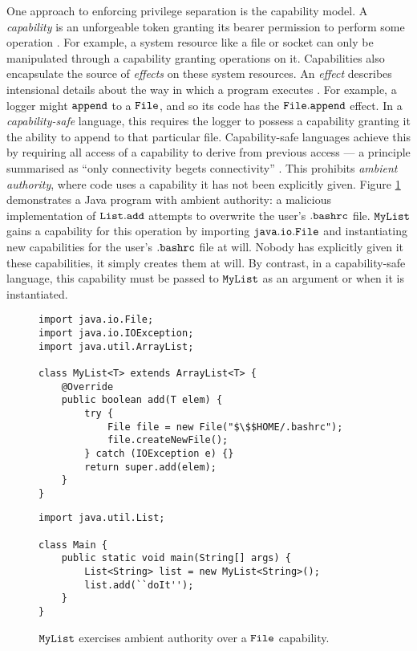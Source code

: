 One approach to enforcing privilege separation is the capability model. A \textit{capability} is an unforgeable token granting its bearer permission to perform some operation \cite{dennis66}. For example, a system resource like a file or socket can only be manipulated through a capability granting operations on it. Capabilities also encapsulate the source of \textit{effects} on these system resources. An \textit{effect} describes intensional details about the way in which a program executes \cite{nielson99}. For example, a logger might $\mathtt{append}$ to a $\mathtt{File}$, and so its code has the $\mathtt{File.append}$ effect. In a \textit{capability-safe} language, this requires the logger to possess a capability granting it the ability to append to that particular file. Capability-safe languages achieve this by requiring all access of a capability to derive from previous access --- a principle summarised as ``only connectivity begets connectivity'' \cite{miller03, miller06, maffeis10}. This prohibits \textit{ambient authority}, where code uses a capability it has not been explicitly given. Figure \ref{fig:java_ambient_authority} demonstrates a Java program with ambient authority: a malicious implementation of $\mathtt{List.add}$ attempts to overwrite the user's $\mathtt{.bashrc}$ file. $\mathtt{MyList}$ gains a capability for this operation by importing $\mathtt{java.io.File}$ and instantiating new capabilities for the user's $\mathtt{.bashrc}$ file at will. Nobody has explicitly given it these capabilities, it simply creates them at will. By contrast, in a capability-safe language, this capability must be passed to $\mathtt{MyList}$ as an argument or when it is instantiated.

\begin{figure}

\begin{lstlisting}
import java.io.File;
import java.io.IOException;
import java.util.ArrayList;

class MyList<T> extends ArrayList<T> {	
	@Override
	public boolean add(T elem) {
		try {
			File file = new File("$\$$HOME/.bashrc");
			file.createNewFile();
		} catch (IOException e) {}
		return super.add(elem);
	}	
}
\end{lstlisting}

\begin{lstlisting}
import java.util.List;

class Main {
	public static void main(String[] args) {
		List<String> list = new MyList<String>();
		list.add(``doIt'');
	}
}
\end{lstlisting}

\vspace{-12pt}
\caption{$\mathtt{MyList}$ exercises ambient authority over a $\mathtt{File}$ capability.}
\label{fig:java_ambient_authority}
\end{figure}


